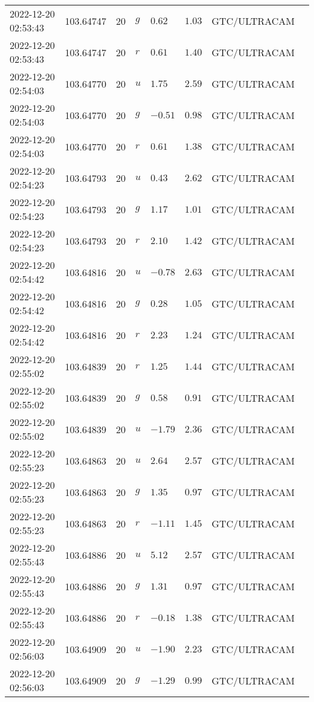 \documentclass{nature_plusfigure}
\begin{document}
\begin{supplement}
\begin{center}
\begin{longtable}{llllllll}
2022-12-20 02:53:43 & 103.64747 & 20 & $g$ & $0.62$ & $1.03$ & GTC/ULTRACAM &  \\ 
2022-12-20 02:53:43 & 103.64747 & 20 & $r$ & $0.61$ & $1.40$ & GTC/ULTRACAM &  \\ 
2022-12-20 02:54:03 & 103.64770 & 20 & $u$ & $1.75$ & $2.59$ & GTC/ULTRACAM &  \\ 
2022-12-20 02:54:03 & 103.64770 & 20 & $g$ & $-0.51$ & $0.98$ & GTC/ULTRACAM &  \\ 
2022-12-20 02:54:03 & 103.64770 & 20 & $r$ & $0.61$ & $1.38$ & GTC/ULTRACAM &  \\ 
2022-12-20 02:54:23 & 103.64793 & 20 & $u$ & $0.43$ & $2.62$ & GTC/ULTRACAM &  \\ 
2022-12-20 02:54:23 & 103.64793 & 20 & $g$ & $1.17$ & $1.01$ & GTC/ULTRACAM &  \\ 
2022-12-20 02:54:23 & 103.64793 & 20 & $r$ & $2.10$ & $1.42$ & GTC/ULTRACAM &  \\ 
2022-12-20 02:54:42 & 103.64816 & 20 & $u$ & $-0.78$ & $2.63$ & GTC/ULTRACAM &  \\ 
2022-12-20 02:54:42 & 103.64816 & 20 & $g$ & $0.28$ & $1.05$ & GTC/ULTRACAM &  \\ 
2022-12-20 02:54:42 & 103.64816 & 20 & $r$ & $2.23$ & $1.24$ & GTC/ULTRACAM &  \\ 
2022-12-20 02:55:02 & 103.64839 & 20 & $r$ & $1.25$ & $1.44$ & GTC/ULTRACAM &  \\ 
2022-12-20 02:55:02 & 103.64839 & 20 & $g$ & $0.58$ & $0.91$ & GTC/ULTRACAM &  \\ 
2022-12-20 02:55:02 & 103.64839 & 20 & $u$ & $-1.79$ & $2.36$ & GTC/ULTRACAM &  \\ 
2022-12-20 02:55:23 & 103.64863 & 20 & $u$ & $2.64$ & $2.57$ & GTC/ULTRACAM &  \\ 
2022-12-20 02:55:23 & 103.64863 & 20 & $g$ & $1.35$ & $0.97$ & GTC/ULTRACAM &  \\ 
2022-12-20 02:55:23 & 103.64863 & 20 & $r$ & $-1.11$ & $1.45$ & GTC/ULTRACAM &  \\ 
2022-12-20 02:55:43 & 103.64886 & 20 & $u$ & $5.12$ & $2.57$ & GTC/ULTRACAM &  \\ 
2022-12-20 02:55:43 & 103.64886 & 20 & $g$ & $1.31$ & $0.97$ & GTC/ULTRACAM &  \\ 
2022-12-20 02:55:43 & 103.64886 & 20 & $r$ & $-0.18$ & $1.38$ & GTC/ULTRACAM &  \\ 
2022-12-20 02:56:03 & 103.64909 & 20 & $u$ & $-1.90$ & $2.23$ & GTC/ULTRACAM &  \\ 
2022-12-20 02:56:03 & 103.64909 & 20 & $g$ & $-1.29$ & $0.99$ & GTC/ULTRACAM &  \\ 

\end{longtable}
\end{center}
\end{supplement}
\end{document}

